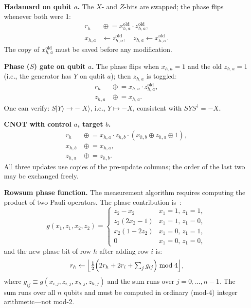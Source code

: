\documentclass[twocolumn,prl,aps,floatfix]{revtex4-2}
\begin{document}
\textbf{Hadamard on qubit $a$.}
The $X$- and $Z$-bits are swapped; the phase flips whenever both were 1:
\begin{align}
  r_h      &\mathrel{\oplus}= x_{h,a}^{\mathrm{old}} \cdot z_{h,a}^{\mathrm{old}}, \nonumber\\
  x_{h,a}  &\leftarrow z_{h,a}^{\mathrm{old}}, \quad
  z_{h,a}   \leftarrow x_{h,a}^{\mathrm{old}}.
  \label{eq:h_rule}
\end{align}
The copy of $x_{h,a}^{\mathrm{old}}$ must be saved before any modification.

\textbf{Phase ($S$) gate on qubit $a$.}
The phase flips when $x_{h,a} = 1$ and the old $z_{h,a} = 1$ (i.e., the generator
has $Y$ on qubit $a$); then $z_{h,a}$ is toggled:
\begin{align}
  r_h      &\mathrel{\oplus}= x_{h,a} \cdot z_{h,a}^{\mathrm{old}}, \nonumber\\
  z_{h,a}  &\mathrel{\oplus}= x_{h,a}.
  \label{eq:s_rule}
\end{align}
One can verify: $S|Y\rangle \to -|X\rangle$, i.e., $Y \mapsto -X$, consistent with
$SYS^\dagger = -X$.

\textbf{CNOT with control $a$, target $b$.}
\begin{align}
  r_h        &\mathrel{\oplus}=
    x_{h,a} \cdot z_{h,b} \cdot (x_{h,b} \oplus z_{h,a} \oplus 1), \nonumber\\
  x_{h,b}    &\mathrel{\oplus}= x_{h,a}, \nonumber\\
  z_{h,a}    &\mathrel{\oplus}= z_{h,b}.
  \label{eq:cnot_rule}
\end{align}
All three updates use copies of the pre-update columns; the order of the last two
may be exchanged freely.

\textbf{Rowsum phase function.}
The measurement algorithm requires computing the product of two Pauli operators.
The phase contribution is~\cite{Aaronson2004}:
\begin{equation}
  g(x_1,z_1,x_2,z_2) =
  \begin{cases}
    z_2 - x_2              & x_1=1,\, z_1=1, \\
    z_2(2x_2 - 1)          & x_1=1,\, z_1=0, \\
    x_2(1 - 2z_2)          & x_1=0,\, z_1=1, \\
    0                      & x_1=0,\, z_1=0,
  \end{cases}
  \label{eq:g_function}
\end{equation}
and the new phase bit of row $h$ after adding row $i$ is:
\begin{equation}
  r_h \leftarrow \Bigl\lfloor\tfrac{1}{2}
  \Bigl(2r_h + 2r_i + \textstyle\sum_{j} g_{ij}
  \Bigr) \bmod 4 \Bigr\rfloor,
  \label{eq:rowsum_phase}
\end{equation}
where $g_{ij} \equiv g(x_{i,j},z_{i,j},x_{h,j},z_{h,j})$ and the sum runs over
$j = 0,\ldots,n-1$.
The sum runs over all $n$ qubits and must be computed in ordinary (mod-4) integer
arithmetic---not mod-2.
\end{document}
